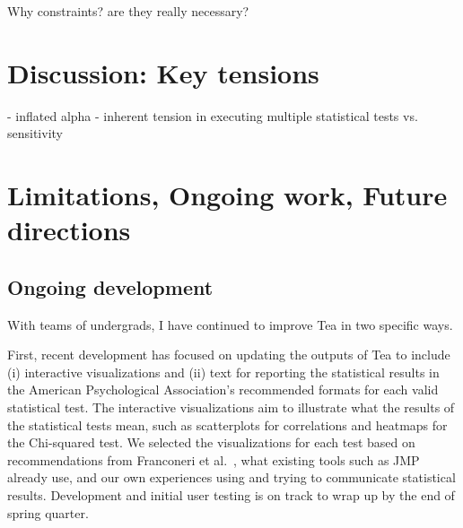 



Why constraints? are they really necessary?



\section{Discussion: Key tensions}
- inflated alpha
- inherent tension in executing multiple statistical tests vs. sensitivity

\section{Limitations, Ongoing work, Future directions}

\subsection{Ongoing development}
With teams of undergrads, I have continued to improve Tea in two specific ways. 

First, recent development has focused on updating the outputs of Tea to include
(i) interactive visualizations and (ii) text for reporting the statistical
results in the American Psychological Association's recommended formats for each
valid statistical test. The interactive visualizations aim to illustrate what
the results of the statistical tests mean, such as scatterplots for correlations
and heatmaps for the Chi-squared test. We selected the visualizations for each
test based on recommendations from Franconeri et
al.~\cite{franconeriVisualizationChooser}, what existing tools such as
JMP~\cite{jmp} already use, and our own experiences using and trying to
communicate statistical results. Development and initial user testing is on
track to wrap up by the end of spring quarter. 

